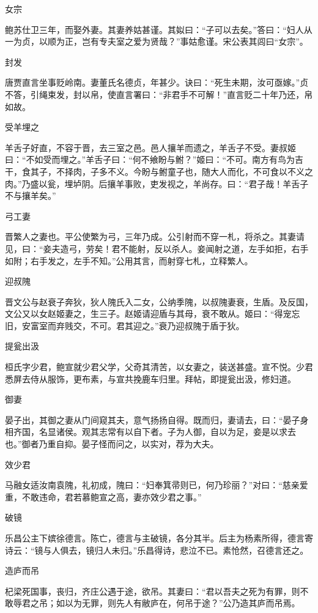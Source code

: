 \documentclass[a4paper,12pt,UTF8,twoside]{ctexbook}
\begin{document}
    女宗
    
    鲍苏仕卫三年，而娶外妻。其妻养姑甚谨。其姒曰：“子可以去矣。”答曰：“妇人从一为贞，以顺为正，岂有专夫室之爱为贤哉？”事姑愈谨。宋公表其闾曰“女宗”。
    
    封发
    
    唐贾直言坐事贬岭南。妻董氏名德贞，年甚少。诀曰：“死生未期，汝可亟嫁。”贞不答，引绳束发，封以帛，使直言署曰：“非君手不可解！”直言贬二十年乃还，帛如故。
    
    受羊埋之
    
    羊舌子好直，不容于晋，去三室之邑。邑人攘羊而遗之，羊舌子不受。妻叔姬曰：“不如受而埋之。”羊舌子曰：“何不飨盼与鲋？”姬曰：“不可。南方有鸟为吉干，食其子，不择肉，子多不义。今盼与鲋童子也，随大人而化，不可食以不义之肉。”乃盛以瓮，埋垆阴。后攘羊事败，吏发视之，羊尚存。曰：“君子哉！羊舌子不与攘羊矣。”
    
    弓工妻
    
    晋繁人之妻也。平公使繁为弓，三年乃成。公引射而不穿一札，将杀之。其妻请见，曰：“妾夫造弓，劳矣！君不能射，反以杀人。妾闻射之道，左手如拒，右手如附；右手发之，左手不知。”公用其言，而射穿七札，立释繁人。
    
    迎叔隗
    
    晋文公与赵衰子奔狄，狄人隗氏入二女，公纳季隗，以叔隗妻衰，生盾。及反国，文公又以女赵姬妻之，生三子。赵姬请迎盾与其母，衰不敢从。姬曰：“得宠忘旧，安富室而弃贱交，不可。君其迎之。”衰乃迎叔隗于盾于狄。
    
    提瓮出汲
    
    桓氏字少君，鲍宣就少君父学，父奇其清苦，以女妻之，装送甚盛。宣不悦。少君悉屏去侍从服饰，更布素，与宣共挽鹿车归里。拜帖，即提瓮出汲，修妇道。
    
    御妻
    
    晏子出，其御之妻从门间窥其夫，意气扬扬自得。既而归，妻请去，曰：“晏子身相齐国，名显诸侯。观其志常有以自下者。子为人御，自以为足，妾是以求去也。”御者乃重自抑。晏子怪而问之，以实对，荐为大夫。
    
    效少君
    
    马融女适汝南袁隗，礼初成，隗曰：“妇奉箕帚则已，何乃珍丽？”对曰：“慈亲爱重，不敢违命，君若慕鲍宣之高，妻亦效少君之事。”
    
    破镜
    
    乐昌公主下嫔徐德言。陈亡，德言与主破镜，各分其半。后主为杨素所得，德言寄诗云：“镜与人俱去，镜归人未归。”乐昌得诗，悲泣不已。素怆然，召德言还之。
    
    造庐而吊
    
    杞梁死国事，丧归，齐庄公遇于途，欲吊。其妻曰：“君以吾夫之死为有罪，则不敢辱君之吊；如以为无罪，则先人有敝庐在，何吊于途？”公乃造其庐而吊焉。
    
\end{document}
